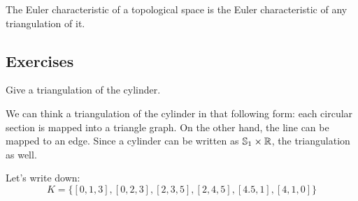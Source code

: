 \begin{definition}
    The Euler characteristic of a topological space is the Euler
    characteristic of any triangulation of it.
\end{definition}

\subsection{Exercises}

\begin{exercise}
    Give a triangulation of the cylinder.
\end{exercise}

We can think a triangulation of the cylinder in that following form: each circular section is mapped
into a triangle graph. On the other hand, the line can be mapped to an edge.
Since a cylinder can be written as $\mathbb{S}_1 \times \mathbb{R}$, the triangulation
as well. 

Let's write
down: 
$$K = \{[0,1,3], [0,2,3], [2,3,5], [2,4,5],[4.5,1],[4,1,0]\}$$

\begin{figure}[H]
    \begin{center}

    \end{center}
\end{figure}



\noindent\linia

